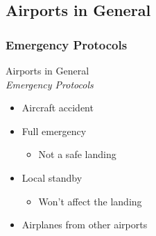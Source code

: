 \subsection{Airports in General}

\subsubsection{Emergency Protocols}
\begin{frame}{Airports in General\\\small\textit{Emergency Protocols}}{}
	\begin{itemize}
		\item Aircraft accident
		\item Full emergency
			\begin{itemize}
				\item Not a safe landing
			\end{itemize}
		\item Local standby
			\begin{itemize}
				\item Won't affect the landing
			\end{itemize}
		\item Airplanes from other airports
	\end{itemize}
\end{frame}